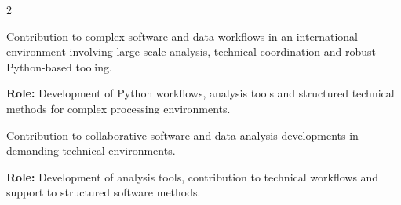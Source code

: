 \documentclass[8pt,a4paper,ragged2e,withhyper]{../_shared/altacv}
\begin{document}
\begin{paracol}{2}







\end{paracol}

\newpage
{}


Contribution to complex software and data workflows in an international environment involving large-scale analysis, technical coordination and robust Python-based tooling.

\textbf{Role:} Development of Python workflows, analysis tools and structured technical methods for complex processing environments.

\divider


Contribution to collaborative software and data analysis developments in demanding technical environments.

\textbf{Role:} Development of analysis tools, contribution to technical workflows and support to structured software methods.

{\small
{}
}
\\
\divider\smallskip
\vspace{-.3cm}
\end{document}
